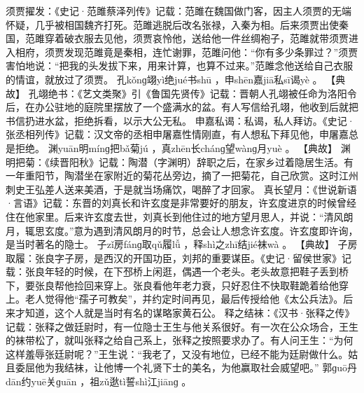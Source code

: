 \documentclass[12pt,UTF8]{ctexbook}
\begin{document}
须贾擢发：《史记·范雎蔡泽列传》记载：范雎在魏国做门客，因主人须贾的无端怀疑，几乎被相国魏齐打死。范雎逃脱后改名张禄，入秦为相。后来须贾出使秦国，范雎穿着破衣服去见他，须贾哀怜他，送给他一件丝绸袍子，范雎就带须贾进入相府，须贾发现范雎竟是秦相，连忙谢罪，范雎问他：“你有多少条罪过？”须贾害怕地说：“把我的头发拔下来，用来计算，也算不过来。”范雎念他送给自己衣服的情谊，就放过了须贾。
孔kǒnɡ翊yì绝jué书shū
，申shēn嘉jiā私sī谒yè
。
【典故】
孔翊绝书：《艺文类聚》引《鲁国先贤传》记载：晋朝人孔翊被任命为洛阳令后，在办公驻地的庭院里摆放了一个盛满水的盆。有人写信给孔翊，他收到后就把书信扔进水盆，拒绝拆看，以示大公无私。
申嘉私谒：私谒，私人拜访。《史记·张丞相列传》记载：汉文帝的丞相申屠嘉性情刚直，有人想私下拜见他，申屠嘉总是拒绝。
渊yuān明mínɡ把bǎ菊jú
，真zhēn长chánɡ望wànɡ月yuè
。
【典故】
渊明把菊：《续晋阳秋》记载：陶潜（字渊明）辞职之后，在家乡过着隐居生活。有一年重阳节，陶潜坐在家附近的菊花丛旁边，摘了一把菊花，自己欣赏。这时江州刺史王弘差人送来美酒，于是就当场痛饮，喝醉了才回家。
真长望月：《世说新语·言语》记载：东晋的刘真长和许玄度是非常要好的朋友，许玄度进京的时候曾经住在他家里。后来许玄度去世，刘真长到他住过的地方望月思人，并说：“清风朗月，辄思玄度。”意为遇到清风朗月的时节，总会让人想念许玄度。许玄度即许询，是当时著名的隐士。
子zǐ房fánɡ取qǔ履lǚ
，释shì之zhī结jié袜wà
。
【典故】
子房取履：张良字子房，是西汉的开国功臣，刘邦的重要谋臣。《史记·留侯世家》记载：张良年轻的时候，在下邳桥上闲逛，偶遇一个老头。老头故意把鞋子丢到桥下，要张良帮他捡回来穿上。张良看他年老力衰，只好忍住不快取鞋跪着给他穿上。老人觉得他“孺子可教矣”，并约定时间再见，最后传授给他《太公兵法》。后来才知道，这个人就是当时有名的谋略家黄石公。
释之结袜：《汉书·张释之传》记载：张释之做廷尉时，有一位隐士王生与他关系很好。有一次在公众场合，王生的袜带松了，就叫张释之给自己系上，张释之按照要求办了。有人问王生：“为何这样羞辱张廷尉呢？”王生说：“我老了，又没有地位，已经不能为廷尉做什么。姑且委屈他为我结袜，让他博一个礼贤下士的美名，为他赢取社会威望吧。”
郭ɡuō丹dān约yuē关ɡuān
，祖zǔ逖tì誓shì江jiānɡ
。
\end{document}

